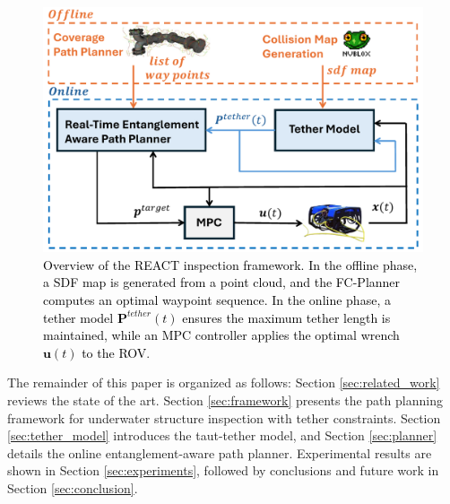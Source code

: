 %
\begin{figure}[t!]
	\centering	\includegraphics[width=0.7\linewidth]{figures/react_abstract.pdf}
	  \caption{\textcolor{black}{Overview of the \ac{REACT} inspection framework. In the offline phase, a \ac{SDF} map is generated from a point cloud, and the FC-Planner \cite{feng2024fc} computes an optimal waypoint sequence. In the online phase, a tether model $\mathbf{P}^{tether}(t)$ ensures the maximum tether length is maintained, while an \ac{MPC} controller applies the optimal wrench $\mathbf{u}(t)$ to the \ac{ROV}}.}
    \label{fig:abstract}
\end{figure}
%


The remainder of this paper is organized as follows: Section \ref{sec:related_work} reviews the state of the art. Section \ref{sec:framework} presents the path planning framework for underwater structure inspection with tether constraints. Section \ref{sec:tether_model} introduces the taut-tether model, and Section \ref{sec:planner} details the online entanglement-aware path planner. Experimental results are shown in Section \ref{sec:experiments}, followed by conclusions and future work in Section \ref{sec:conclusion}.





